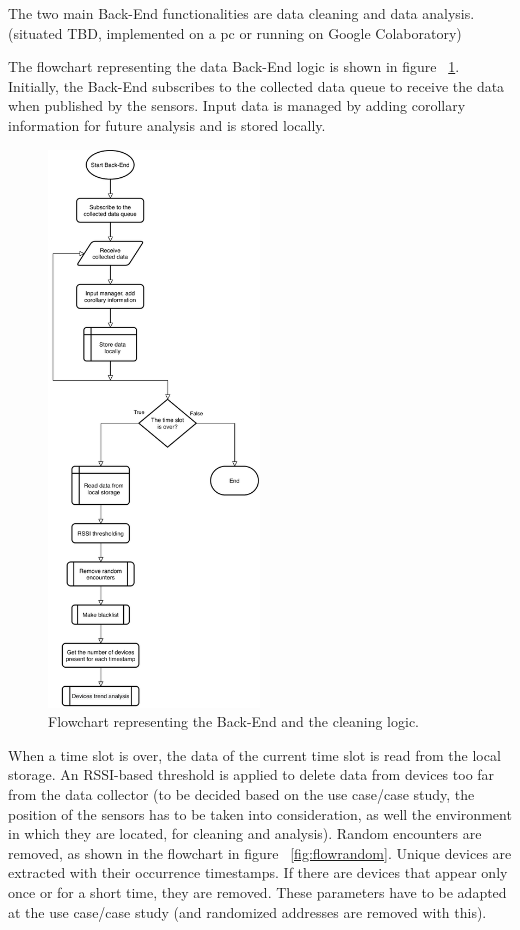 The two main Back-End functionalities are data cleaning and data analysis.(situated TBD, implemented on a pc or running on Google Colaboratory)

The flowchart representing the data Back-End logic is shown in figure ~\ref{fig:flowcleaner}. Initially, the Back-End subscribes to the collected data queue to receive the data when published by the sensors. Input data is managed by adding corollary information for future analysis and is stored locally.

\begin{figure}[h]
\centering 
\includegraphics[width=0.5\textwidth]{images/flowcleaner} 
\caption{Flowchart representing the Back-End and the cleaning logic.}
\label{fig:flowcleaner}
\end{figure}

When a time slot is over, the data of the current time slot is read from the local storage. An RSSI-based threshold is applied to delete data from devices too far from the data collector (to be decided based on the use case/case study, the position of the sensors has to be taken into consideration, as well the environment in which they are located, for cleaning and analysis). Random encounters are removed, as shown in the flowchart in figure ~\ref{fig:flowrandom}. Unique devices are extracted with their occurrence timestamps. If there are devices that appear only once or for a short time,  they are removed. These parameters have to be adapted at the use case/case study (and randomized addresses are removed with this).

